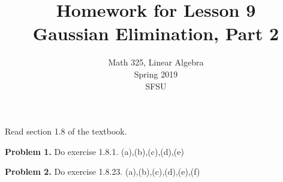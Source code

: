 \documentclass[oneside,12pt]{amsart}
\begin{document}
\title{Homework for Lesson 9 \\ Gaussian Elimination, Part 2}
\author{Math 325, Linear Algebra \\ Spring 2019\\ SFSU }
\date{}

\maketitle

Read section 1.8 of the textbook.

\bigskip

\textbf{Problem 1.} Do exercise 1.8.1. (a),(b),(c),(d),(e)

\bigskip
\bigskip
\bigskip


\textbf{Problem 2.} Do exercise 1.8.23. (a),(b),(c),(d),(e),(f)

\bigskip
\bigskip
\bigskip
\end{document}

